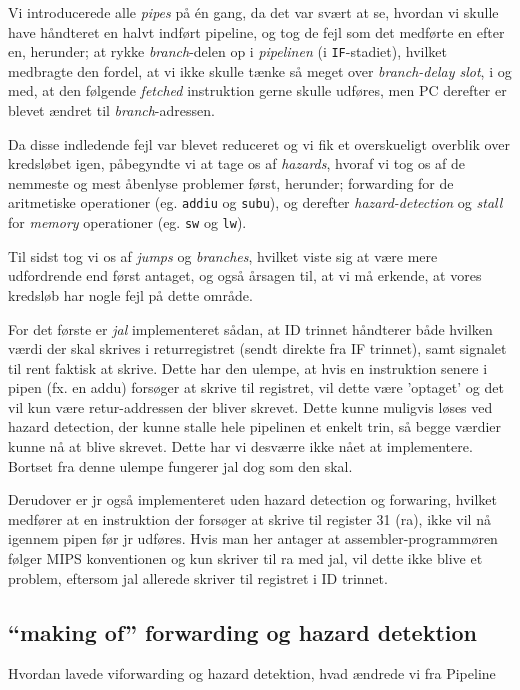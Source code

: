 \documentclass[11pt,twoside,a4paper]{article}
\begin{document}
Vi introducerede alle {\it pipes} på én gang, da det var svært at se, hvordan
vi skulle have håndteret en halvt indført pipeline, og tog de fejl som det
medførte en efter en, herunder; at rykke {\it branch}-delen op i
{\it pipelinen} (i {\tt IF}-stadiet), hvilket medbragte den fordel, at vi ikke
skulle tænke så meget over {\it branch-delay slot}, i og med, at den følgende
{\it fetched} instruktion gerne skulle udføres, men PC derefter er blevet
ændret til {\it branch}-adressen.

Da disse indledende fejl var blevet reduceret og vi fik et overskueligt
overblik over kredsløbet igen, påbegyndte vi at tage os af {\it hazards},
hvoraf vi tog os af de nemmeste og mest åbenlyse problemer først, herunder;
forwarding for de aritmetiske operationer (eg. {\tt addiu} og {\tt subu}),
og derefter {\it hazard-detection} og {\it stall} for {\it memory} operationer
(eg. {\tt sw} og {\tt lw}).

Til sidst tog vi os af {\it jumps} og {\it branches}, hvilket viste sig at være mere udfordrende
end først antaget, og også årsagen til, at vi må erkende, at vores kredsløb
har nogle fejl på dette område.

For det første er {\it jal} implementeret sådan, at ID trinnet håndterer både hvilken værdi
der skal skrives i returregistret (sendt direkte fra IF trinnet), samt signalet til rent faktisk at
skrive. Dette har den ulempe, at hvis en instruktion senere i pipen (fx. en addu) forsøger at
skrive til registret, vil dette være 'optaget' og det vil kun være retur-addressen der bliver
skrevet. Dette kunne muligvis løses ved hazard detection, der kunne stalle hele pipelinen
et enkelt trin, så begge værdier kunne nå at blive skrevet. Dette har vi desværre ikke nået
at implementere. Bortset fra denne ulempe fungerer jal dog som den skal.

Derudover er jr også implementeret uden hazard detection og forwaring, hvilket medfører
at en instruktion der forsøger at skrive til register 31 (ra), ikke vil nå igennem pipen før jr udføres.
Hvis man her antager at assembler-programmøren følger MIPS konventionen og kun skriver til ra
med jal, vil dette ikke blive et problem, eftersom jal allerede skriver til registret i ID trinnet.

\subsection{``making of'' forwarding og hazard detektion}
Hvordan lavede viforwarding og hazard detektion, hvad ændrede vi fra Pipeline
\end{document}
